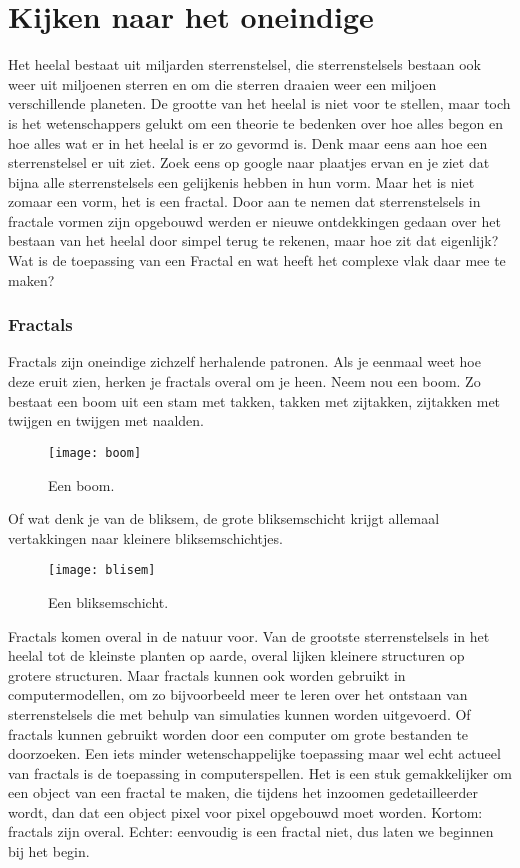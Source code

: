 \documentclass[11pt,fleqn]{book} %
\begin{document}
\chapter{Kijken naar het oneindige}
Het heelal bestaat uit miljarden sterrenstelsel, die sterrenstelsels bestaan ook weer uit miljoenen sterren en om die sterren draaien weer een miljoen verschillende planeten. De grootte van het heelal is niet voor te stellen, maar toch is het wetenschappers gelukt om een theorie te bedenken over hoe alles begon en hoe alles wat er in het heelal is er zo gevormd is. Denk maar eens aan hoe een sterrenstelsel er uit ziet. Zoek eens op google naar plaatjes ervan en je ziet dat bijna alle sterrenstelsels een gelijkenis hebben in hun vorm. Maar het is niet zomaar een vorm, het is een fractal. Door aan te nemen dat sterrenstelsels in fractale vormen zijn opgebouwd werden er nieuwe ontdekkingen gedaan over het bestaan van het heelal door simpel terug te rekenen, maar hoe zit dat eigenlijk? Wat is de toepassing van een Fractal en wat heeft het complexe vlak daar mee te maken?

\subsection{Fractals}
Fractals zijn oneindige zichzelf herhalende patronen. Als je eenmaal weet hoe deze eruit zien, herken je fractals overal om je heen. 
Neem nou een boom. Zo bestaat een boom uit een stam met takken, takken met zijtakken, zijtakken met twijgen en twijgen met naalden.
\begin{figure}[h]
	\centering\texttt{[image: boom]}
	\caption{Een boom.}
	\label{fig:boom}
\end{figure}
Of wat denk je van de bliksem, de grote bliksemschicht krijgt allemaal vertakkingen naar kleinere bliksemschichtjes.
\begin{figure}[h]
	\centering\texttt{[image: blisem]}
	\caption{Een bliksemschicht.}
	\label{fig:bliksem}
\end{figure}

Fractals komen overal in de natuur voor. Van de grootste sterrenstelsels in het heelal tot de kleinste planten op aarde, overal lijken kleinere structuren op grotere structuren. Maar fractals kunnen ook worden gebruikt in computermodellen, om zo bijvoorbeeld meer te leren over het ontstaan van sterrenstelsels die met behulp van simulaties kunnen worden uitgevoerd. Of fractals kunnen gebruikt worden door een computer om grote bestanden te doorzoeken. Een iets minder wetenschappelijke toepassing maar wel echt actueel van fractals is de toepassing in computerspellen. Het is een stuk gemakkelijker om een object van een fractal te maken, die tijdens het inzoomen gedetailleerder wordt, dan dat een object pixel voor pixel opgebouwd moet worden. Kortom: fractals zijn overal. Echter: eenvoudig is een fractal niet, dus laten we beginnen bij het begin.
\end{document}
